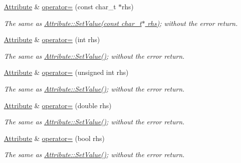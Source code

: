 \begin{DoxyCompactItemize}
\hyperlink{classphys_1_1xml_1_1Attribute}{Attribute} \& \hyperlink{classphys_1_1xml_1_1Attribute_a78d7a0436d386040e2d1f8954304b25b}{operator=} (const char\_\-t $\ast$rhs)
\begin{DoxyCompactList}\small\item\em The same as \hyperlink{classphys_1_1xml_1_1Attribute_a470512fcd8b4f7609319bf85df100aaa}{Attribute::SetValue(const char\_\-t$\ast$ rhs)}; without the error return. \item\end{DoxyCompactList}\item 
\hyperlink{classphys_1_1xml_1_1Attribute}{Attribute} \& \hyperlink{classphys_1_1xml_1_1Attribute_ac9a18c2b6c4bfc0cdfe4eede938a91fe}{operator=} (int rhs)
\begin{DoxyCompactList}\small\item\em The same as \hyperlink{classphys_1_1xml_1_1Attribute_a470512fcd8b4f7609319bf85df100aaa}{Attribute::SetValue()}; without the error return. \item\end{DoxyCompactList}\item 
\hyperlink{classphys_1_1xml_1_1Attribute}{Attribute} \& \hyperlink{classphys_1_1xml_1_1Attribute_af6b6e5202b23be948b986cb0bcdf5da8}{operator=} (unsigned int rhs)
\begin{DoxyCompactList}\small\item\em The same as \hyperlink{classphys_1_1xml_1_1Attribute_a470512fcd8b4f7609319bf85df100aaa}{Attribute::SetValue()}; without the error return. \item\end{DoxyCompactList}\item 
\hyperlink{classphys_1_1xml_1_1Attribute}{Attribute} \& \hyperlink{classphys_1_1xml_1_1Attribute_ac92a92492d624984a52b64bc4fabf355}{operator=} (double rhs)
\begin{DoxyCompactList}\small\item\em The same as \hyperlink{classphys_1_1xml_1_1Attribute_a470512fcd8b4f7609319bf85df100aaa}{Attribute::SetValue()}; without the error return. \item\end{DoxyCompactList}\item 
\hyperlink{classphys_1_1xml_1_1Attribute}{Attribute} \& \hyperlink{classphys_1_1xml_1_1Attribute_a008397ad3c9c63bf27a4dca4b68e5efd}{operator=} (bool rhs)
\begin{DoxyCompactList}\small\item\em The same as \hyperlink{classphys_1_1xml_1_1Attribute_a470512fcd8b4f7609319bf85df100aaa}{Attribute::SetValue()}; without the error return. \item\end{DoxyCompactList}\item 

\end{DoxyCompactItemize}
